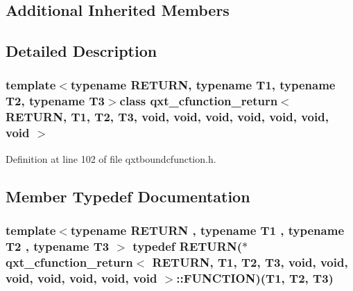 \subsection*{Additional Inherited Members}


\subsection{Detailed Description}
\subsubsection*{template$<$typename R\-E\-T\-U\-R\-N, typename T1, typename T2, typename T3$>$class qxt\-\_\-cfunction\-\_\-return$<$ R\-E\-T\-U\-R\-N, T1, T2, T3, void, void, void, void, void, void, void $>$}



Definition at line 102 of file qxtboundcfunction.\-h.



\subsection{Member Typedef Documentation}
\hypertarget{classqxt__cfunction__return_3_01_r_e_t_u_r_n_00_01_t1_00_01_t2_00_01_t3_00_01void_00_01void_00_08c629501f46f0b8164288b52f788e233_a81eb36d3be75530b01f7eaa7c9444f7c}{
\subsubsection[{F\-U\-N\-C\-T\-I\-O\-N}]{\setlength{\rightskip}{0pt plus 5cm}template$<$typename R\-E\-T\-U\-R\-N , typename T1 , typename T2 , typename T3 $>$ typedef R\-E\-T\-U\-R\-N($\ast$ {\bf qxt\-\_\-cfunction\-\_\-return}$<$ R\-E\-T\-U\-R\-N, T1, T2, T3, {\bf void}, {\bf void}, {\bf void}, {\bf void}, {\bf void}, {\bf void}, {\bf void} $>$\-::F\-U\-N\-C\-T\-I\-O\-N)(T1, T2, T3)}}\label{classqxt__cfunction__return_3_01_r_e_t_u_r_n_00_01_t1_00_01_t2_00_01_t3_00_01void_00_01void_00_08c629501f46f0b8164288b52f788e233_a81eb36d3be75530b01f7eaa7c9444f7c}



